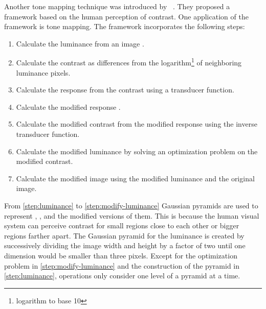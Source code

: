 Another tone mapping technique was introduced by \citeauthor{Mantiuk2006}~\cite{Mantiuk2006}.
%
%
They proposed a framework based on the human perception of contrast.
One application of the framework is tone mapping.
The framework incorporates the following steps:
\begin{enumerate}[label=Step \arabic{enumi}.,ref=Step \arabic{enumi},leftmargin=*]
	\item \label{step:luminance}
		Calculate the luminance \luminance{} from an image \image.
	\item \label{step:contrast}
		Calculate the contrast \contrast{} as differences from the logarithm\footnote{logarithm to base 10} of neighboring luminance pixels. 
	\item \label{step:response}
		Calculate the response \response{} from the contrast using a transducer function. 
	\item \label{step:modify-response} 
		Calculate the modified response \modifiedresponse. 
	\item \label{step:modify-contrast} 
		Calculate the modified contrast \modifiedcontrast{} from the modified response using the inverse transducer function. 
	\item \label{step:modify-luminance}
		Calculate the modified luminance \modifiedluminance{} by solving an optimization problem on the modified contrast. 
	\item \label{step:modify-image}
		Calculate the modified image \modifiedimage{} using the modified luminance and the original image. 
\end{enumerate}
From \ref{step:luminance} to \ref{step:modify-luminance} Gaussian pyramids are used to represent \luminance, \contrast, \response{} and the modified versions of them. 
This is because the human visual system can perceive contrast for small regions close to each other or bigger regions farther apart.
The Gaussian pyramid for the luminance is created by successively dividing the image width and height by a factor of two until one dimension would be smaller than three pixels.
Except for the optimization problem in \ref{step:modify-luminance} and the construction of the pyramid in \ref{step:luminance}, operations only consider one level of a pyramid at a time.

